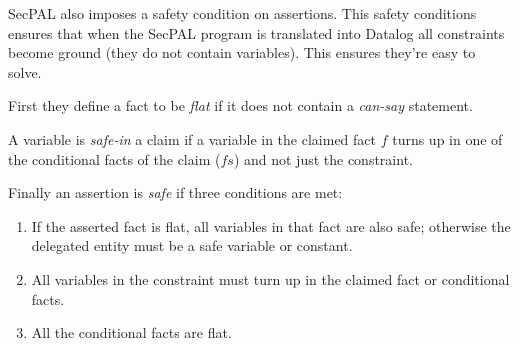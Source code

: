 \documentclass[a4paper]{article}
\begin{document}
SecPAL also imposes a safety condition on assertions.  This safety conditions
ensures that when the SecPAL program is translated into Datalog all constraints
become ground (they do not contain variables).  This ensures they're easy to
solve. 

First they define a fact to be \emph{flat} if it does not contain a
\emph{can-say} statement.

\begin{algorithm}[H]
\end{algorithm}

A variable is \emph{safe-in} a claim if a variable in the claimed fact $f$ turns up in one of the
conditional facts of the claim ($fs$) and not just the constraint.

\begin{algorithm}[H]
\end{algorithm}

Finally an assertion is \emph{safe} if three conditions are met:

\begin{enumerate}
  \item If the asserted fact is flat, all variables in that fact are also safe;
    otherwise the delegated entity must be a safe variable or constant.
  \item All variables in the constraint must turn up in the claimed fact or
    conditional facts.
  \item All the conditional facts are flat.
\end{enumerate}
\end{document}
